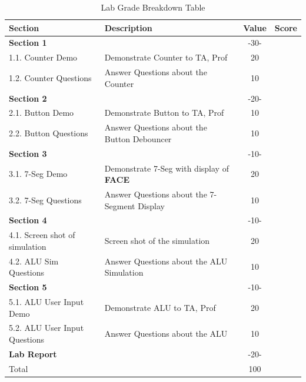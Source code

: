 \documentclass{article}
\begin{document}
\begin{table}[!htb]
  \begin{center}
    \begin{tabular}[width=0.8\textwidth]{|l|l|c|l|}
       \hline
       Section & Description & Value & Score\\
       \hline 
       \multicolumn{2}{|l}{\textbf{Section 1}}  & -30- &\\
       \hline
       1.1. Counter Demo & Demonstrate Counter to TA, Prof & 20 &\\
       1.2. Counter Questions & Answer Questions about the Counter & 10 &\\
       \hline
       \multicolumn{2}{|l}{\textbf{Section 2}}  & -20- &\\
       \hline
       2.1. Button Demo & Demonstrate Button to TA, Prof & 10 &\\
       2.2. Button Questions & Answer Questions about the Button Debouncer & 10 &\\
       \hline
       \multicolumn{2}{|l}{\textbf{Section 3}}  & -10- &\\
       \hline
       3.1. 7-Seg Demo & Demonstrate 7-Seg with display of \textbf{FACE} & 20 &\\
       3.2. 7-Seg Questions & Answer Questions about the 7-Segment Display & 10 &\\
       \hline
       \multicolumn{2}{|l}{\textbf{Section 4}}  & -10- &\\
       \hline
       4.1. Screen shot of simulation &  Screen shot of the simulation & 20 &\\
       4.2. ALU Sim Questions & Answer Questions about the ALU Simulation & 10 &\\
       \hline
       \multicolumn{2}{|l}{\textbf{Section 5}}  & -10- &\\
       \hline
       5.1. ALU User Input Demo & Demonstrate ALU to TA, Prof & 20 &\\
       5.2. ALU User Input Questions & Answer Questions about the ALU & 10 &\\
       \hline
       \multicolumn{2}{|l}{\textbf{Lab Report}}  & -20- &\\
       \hline
       \hline
       \multicolumn{2}{|l}{Total} & \multicolumn{1}{c|}{100} &\\
       \hline
    \end{tabular}
  \end{center}
  \caption{Lab Grade Breakdown Table}
\end{table}
\end{document}
